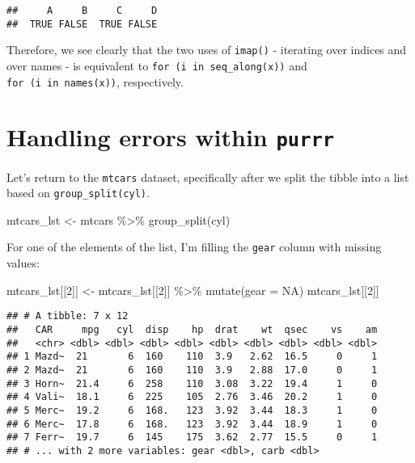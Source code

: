 \documentclass[
]{book}
\newenvironment{Shaded}{\begin{snugshade}}{\end{snugshade}}
\newcommand{\AttributeTok}[1]{\textcolor[rgb]{0.77,0.63,0.00}{#1}}
\newcommand{\ConstantTok}[1]{\textcolor[rgb]{0.00,0.00,0.00}{#1}}
\newcommand{\DecValTok}[1]{\textcolor[rgb]{0.00,0.00,0.81}{#1}}
\newcommand{\FunctionTok}[1]{\textcolor[rgb]{0.00,0.00,0.00}{#1}}
\newcommand{\NormalTok}[1]{#1}
\newcommand{\OtherTok}[1]{\textcolor[rgb]{0.56,0.35,0.01}{#1}}
\newcommand{\SpecialCharTok}[1]{\textcolor[rgb]{0.00,0.00,0.00}{#1}}
\begin{document}
\begin{verbatim}
##     A     B     C     D 
##  TRUE FALSE  TRUE FALSE
\end{verbatim}

Therefore, we see clearly that the two uses of \texttt{imap()} - iterating over indices and over names - is equivalent to \texttt{for\ (i\ in\ seq\_along(x))} and \texttt{for\ (i\ in\ names(x))}, respectively.

\hypertarget{handling-errors-within-purrr}{%
\section{\texorpdfstring{Handling errors within \texttt{purrr}}{Handling errors within purrr}}\label{handling-errors-within-purrr}}

Let's return to the \texttt{mtcars} dataset, specifically after we split the tibble into a list based on \texttt{group\_split(cyl)}.

\begin{Shaded}
\begin{Highlighting}[]
\NormalTok{mtcars\_lst }\OtherTok{\textless{}{-}}\NormalTok{ mtcars }\SpecialCharTok{\%\textgreater{}\%} \FunctionTok{group\_split}\NormalTok{(cyl)}
\end{Highlighting}
\end{Shaded}

For one of the elements of the list, I'm filling the \texttt{gear} column with missing values:

\begin{Shaded}
\begin{Highlighting}[]
\NormalTok{mtcars\_lst[[}\DecValTok{2}\NormalTok{]] }\OtherTok{\textless{}{-}}\NormalTok{ mtcars\_lst[[}\DecValTok{2}\NormalTok{]] }\SpecialCharTok{\%\textgreater{}\%} \FunctionTok{mutate}\NormalTok{(}\AttributeTok{gear =} \ConstantTok{NA}\NormalTok{)}
\NormalTok{mtcars\_lst[[}\DecValTok{2}\NormalTok{]]}
\end{Highlighting}
\end{Shaded}

\begin{verbatim}
## # A tibble: 7 x 12
##   CAR     mpg   cyl  disp    hp  drat    wt  qsec    vs    am
##   <chr> <dbl> <dbl> <dbl> <dbl> <dbl> <dbl> <dbl> <dbl> <dbl>
## 1 Mazd~  21       6  160    110  3.9   2.62  16.5     0     1
## 2 Mazd~  21       6  160    110  3.9   2.88  17.0     0     1
## 3 Horn~  21.4     6  258    110  3.08  3.22  19.4     1     0
## 4 Vali~  18.1     6  225    105  2.76  3.46  20.2     1     0
## 5 Merc~  19.2     6  168.   123  3.92  3.44  18.3     1     0
## 6 Merc~  17.8     6  168.   123  3.92  3.44  18.9     1     0
## 7 Ferr~  19.7     6  145    175  3.62  2.77  15.5     0     1
## # ... with 2 more variables: gear <dbl>, carb <dbl>
\end{verbatim}
\end{document}
